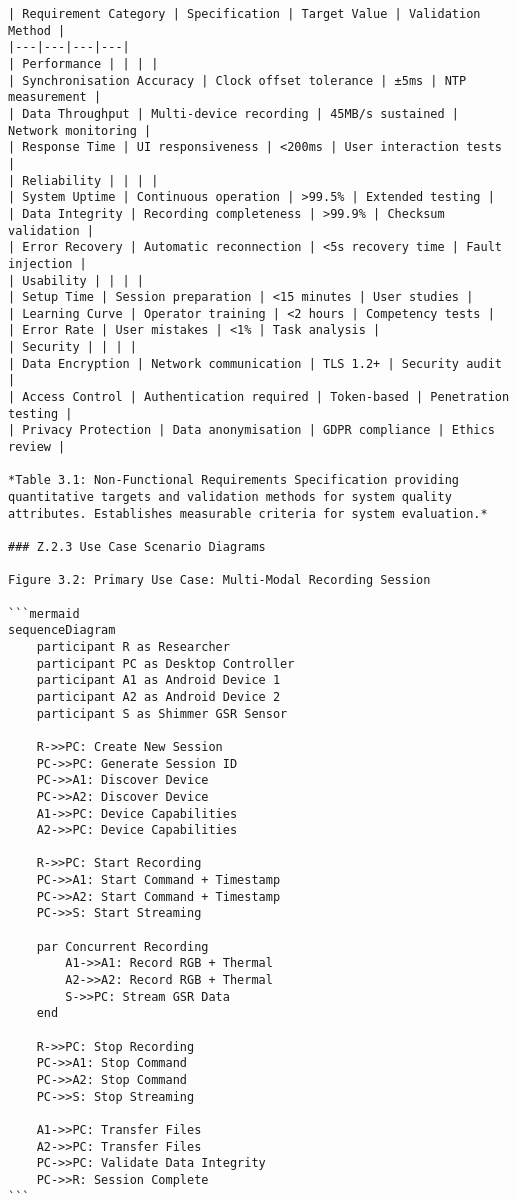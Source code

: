 \begin{verbatim}
| Requirement Category | Specification | Target Value | Validation Method |
|---|---|---|---|
| Performance | | | |
| Synchronisation Accuracy | Clock offset tolerance | ±5ms | NTP measurement |
| Data Throughput | Multi-device recording | 45MB/s sustained | Network monitoring |
| Response Time | UI responsiveness | <200ms | User interaction tests |
| Reliability | | | |
| System Uptime | Continuous operation | >99.5% | Extended testing |
| Data Integrity | Recording completeness | >99.9% | Checksum validation |
| Error Recovery | Automatic reconnection | <5s recovery time | Fault injection |
| Usability | | | |
| Setup Time | Session preparation | <15 minutes | User studies |
| Learning Curve | Operator training | <2 hours | Competency tests |
| Error Rate | User mistakes | <1% | Task analysis |
| Security | | | |
| Data Encryption | Network communication | TLS 1.2+ | Security audit |
| Access Control | Authentication required | Token-based | Penetration testing |
| Privacy Protection | Data anonymisation | GDPR compliance | Ethics review |

*Table 3.1: Non-Functional Requirements Specification providing
quantitative targets and validation methods for system quality
attributes. Establishes measurable criteria for system evaluation.*

### Z.2.3 Use Case Scenario Diagrams

Figure 3.2: Primary Use Case: Multi-Modal Recording Session

```mermaid
sequenceDiagram
    participant R as Researcher
    participant PC as Desktop Controller
    participant A1 as Android Device 1
    participant A2 as Android Device 2
    participant S as Shimmer GSR Sensor

    R->>PC: Create New Session
    PC->>PC: Generate Session ID
    PC->>A1: Discover Device
    PC->>A2: Discover Device
    A1->>PC: Device Capabilities
    A2->>PC: Device Capabilities

    R->>PC: Start Recording
    PC->>A1: Start Command + Timestamp
    PC->>A2: Start Command + Timestamp
    PC->>S: Start Streaming

    par Concurrent Recording
        A1->>A1: Record RGB + Thermal
        A2->>A2: Record RGB + Thermal
        S->>PC: Stream GSR Data
    end

    R->>PC: Stop Recording
    PC->>A1: Stop Command
    PC->>A2: Stop Command
    PC->>S: Stop Streaming

    A1->>PC: Transfer Files
    A2->>PC: Transfer Files
    PC->>PC: Validate Data Integrity
    PC->>R: Session Complete
```


\end{verbatim}
